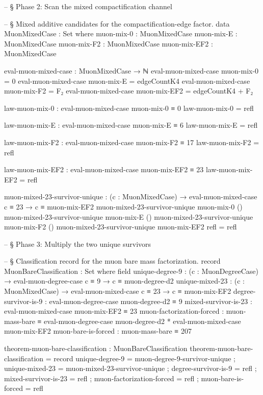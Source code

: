\documentclass[11pt,a4paper]{book}
\begin{document}
\begin{code}
-- § Phase 2: Scan the mixed compactification channel

-- § Mixed additive candidates for the compactification-edge factor.
data MuonMixedCase : Set where
  muon-mix-0    : MuonMixedCase
  muon-mix-E    : MuonMixedCase
  muon-mix-F2   : MuonMixedCase
  muon-mix-EF2  : MuonMixedCase

eval-muon-mixed-case : MuonMixedCase → ℕ
eval-muon-mixed-case muon-mix-0   = 0
eval-muon-mixed-case muon-mix-E   = edgeCountK4
eval-muon-mixed-case muon-mix-F2  = F₂
eval-muon-mixed-case muon-mix-EF2 = edgeCountK4 + F₂

law-muon-mix-0 : eval-muon-mixed-case muon-mix-0 ≡ 0
law-muon-mix-0 = refl

law-muon-mix-E : eval-muon-mixed-case muon-mix-E ≡ 6
law-muon-mix-E = refl

law-muon-mix-F2 : eval-muon-mixed-case muon-mix-F2 ≡ 17
law-muon-mix-F2 = refl

law-muon-mix-EF2 : eval-muon-mixed-case muon-mix-EF2 ≡ 23
law-muon-mix-EF2 = refl

muon-mixed-23-survivor-unique :
  (c : MuonMixedCase) →
  eval-muon-mixed-case c ≡ 23 →
  c ≡ muon-mix-EF2
muon-mixed-23-survivor-unique muon-mix-0 ()
muon-mixed-23-survivor-unique muon-mix-E ()
muon-mixed-23-survivor-unique muon-mix-F2 ()
muon-mixed-23-survivor-unique muon-mix-EF2 refl = refl

-- § Phase 3: Multiply the two unique survivors

-- § Classification record for the muon bare mass factorization.
record MuonBareClassification : Set where
  field
    unique-degree-9 :
      (c : MuonDegreeCase) →
      eval-muon-degree-case c ≡ 9 →
      c ≡ muon-degree-d2
    unique-mixed-23 :
      (c : MuonMixedCase) →
      eval-muon-mixed-case c ≡ 23 →
      c ≡ muon-mix-EF2
    degree-survivor-is-9 : eval-muon-degree-case muon-degree-d2 ≡ 9
    mixed-survivor-is-23 : eval-muon-mixed-case muon-mix-EF2 ≡ 23
    muon-factorization-forced :
      muon-mass-bare ≡ eval-muon-degree-case muon-degree-d2 * eval-muon-mixed-case muon-mix-EF2
    muon-bare-is-forced : muon-mass-bare ≡ 207

theorem-muon-bare-classification : MuonBareClassification
theorem-muon-bare-classification = record
  { unique-degree-9 = muon-degree-9-survivor-unique
  ; unique-mixed-23 = muon-mixed-23-survivor-unique
  ; degree-survivor-is-9 = refl
  ; mixed-survivor-is-23 = refl
  ; muon-factorization-forced = refl
  ; muon-bare-is-forced = refl
  }




\end{code}
\end{document}
